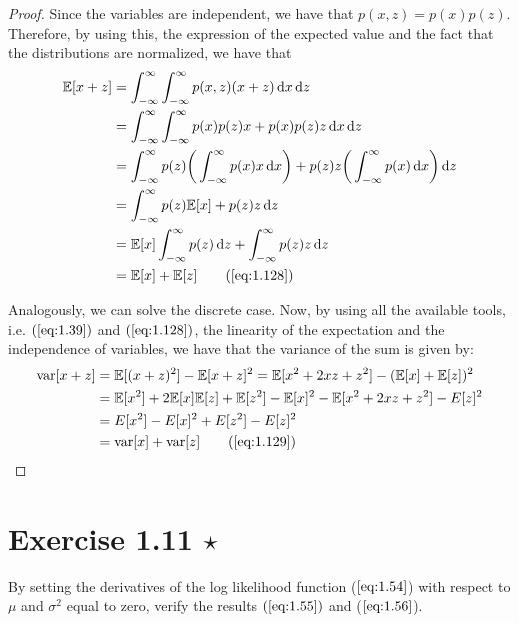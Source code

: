 \vspace{1em}

\begin{proof}
    Since the variables are independent, we have that $p(x, z) = p(x)p(z)$. Therefore,
    by using this, the expression of the expected value and the fact that the distributions
    are normalized, we have that
    \begin{align*}
         \mathbb{E}[x + z] 
        &= \int_{-\infty}^{\infty} \int_{-\infty}^{\infty} p(x, z) (x + z) \diff x \diff z \\
        &= \int_{-\infty}^{\infty} \int_{-\infty}^{\infty} p(x)p(z) x + p(x)p(z)z \diff x \diff z \\
        &= \int_{-\infty}^{\infty} p(z) \bigg(\int_{-\infty}^{\infty} p(x) x \diff x\bigg) + p(z) z \bigg(\int_{-\infty}^{\infty} p(x) \diff x\bigg) \diff z \\
        &= \int_{-\infty}^{\infty} p(z) \mathbb{E}[x] + p(z)z \diff z \\
        &= \mathbb{E}[x] \int_{-\infty}^{\infty} p(z) \diff z + \int_{-\infty}^{\infty} p(z) z \diff z \\
        &= \mathbb{E}[x] + \mathbb{E}[z] \tag{\ref{eq:1.128}}
    \end{align*}

    Analogously, we can solve the discrete case. Now, by using all the available tools,
    i.e. $(\ref{eq:1.39})$ and $(\ref{eq:1.128})$, the linearity of the expectation
    and the independence of variables, we have that the variance of the sum is given by:
    \begin{align*}
        \text{var}[x + z] 
        &= \mathbb{E}[(x + z)^2] - \mathbb{E}[x + z]^2
        = \mathbb{E}[x^2 + 2xz + z^2] - (\mathbb{E}[x] + \mathbb{E}[z])^2 \\
        &= \mathbb{E}[x^2] + 2\mathbb{E}[x]\mathbb{E}[z] + \mathbb{E}[z^2] - \mathbb{E}[x]^2 
        - \mathbb{E}[x^2 + 2xz + z^2] - E[z]^2 \\
        &= E[x^2] - E[x]^2 + E[z^2] - E[z]^2 \\
        &= \text{var}[x] + \text{var}[z] \tag{\ref{eq:1.129}}
    \end{align*}
\end{proof}

\section*{Exercise 1.11 $\star$}
By setting the derivatives of the log likelihood function ($\ref{eq:1.54}$) with respect to $\mu$
and $\sigma^2$ equal to zero, verify the results $(\ref{eq:1.55})$ and ($\ref{eq:1.56}$).

